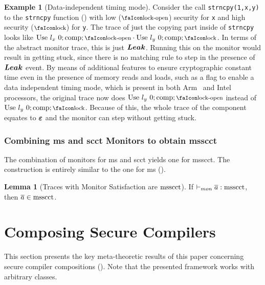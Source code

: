 \documentclass[dvipsnames,conference]{IEEEtran}
\theoremstyle{definition}
\newtheorem{exampleenv}{Example}[section]
\newtheorem{lemma}{Lemma}[section]
\begin{document}
\begin{exampleenv}[Data-independent timing mode]\label{ex:ditm}
  Consider the call \texttt{strncpy(1,x,y)} to the \texttt{strncpy} function () with low ($\unlock$) security for \texttt{x} and high security ($\lock$) for \texttt{y}.
  The trace of just the copying part inside of \texttt{strncpy} looks like $\ev{Use}\ \loc_{x}\ 0;\comp;\unlock\cdot\ev{Use}\ \loc_{y}\ 0;\comp;\lock$.
  In terms of the abstract monitor trace, this is just $\bm{Leak}$.
  Running this on the monitor would result in getting stuck, since there is no matching rule to step in the presence of $\bm{Leak}$ event. %
  By means of additional features to ensure cryptographic constant time even in the presence of memory reads and loads, such as a flag to enable a data independent timing mode, which is present in both Arm~\cite[p.~543]{arm-refman} and Intel~\cite[p.~80]{intel-refman} processors, the original trace now does $\ev{Use}\ \loc_{y}\ 0;\comp;\unlock$ instead of $\ev{Use}\ \loc_{y}\ 0;\comp;\lock$.
  Because of this, the whole trace of the component equates to $\bm{\varepsilon}$ and the monitor can step without getting stuck.
\end{exampleenv}

\subsubsection{Combining \gls*{ms} and \gls*{scct} Monitors to obtain \gls*{msscct}}

The combination of monitors for \gls*{ms} and \gls*{scct} yields one for \gls*{msscct}.
The construction is entirely similar to the one for \gls*{ms} ().

\begin{lemma}[Traces with Monitor Satisfaction are $\operatorname{msscct}$]\label{lem:mon:msscctsafe}
  If $\vdash_{mon}{\overline{a}}:{\operatorname{msscct}}$, then $\overline{a}\in\operatorname{msscct}$. %
\end{lemma}

\section{Composing Secure Compilers}\label{sec:compcomp}

This section presents the key meta-theoretic results of this paper concerning secure compiler compositions ().
Note that the presented framework works with arbitrary classes.
\end{document}
